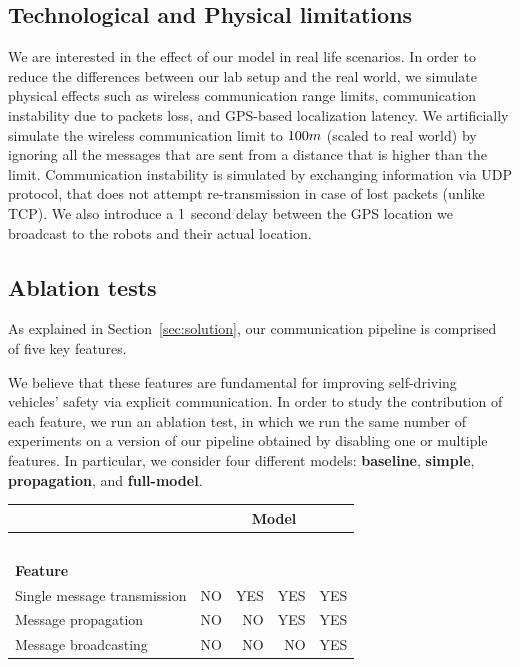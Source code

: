 \subsection{Technological and Physical limitations}
We are interested in the effect of our model in real life scenarios. In order to reduce the differences between 
our lab setup and the real world, we simulate physical effects such as wireless communication range limits, 
communication instability due to packets loss, and GPS-based localization latency.
We artificially simulate the wireless communication limit to $\wireless_limit_meter m$ (scaled to real world) by 
ignoring all the messages that are sent from a distance that is higher than the limit. Communication instability
is simulated by exchanging information via UDP protocol, that does not attempt re-transmission in case
of lost packets (unlike TCP). We also introduce a $\gps_delay_sec$ second delay between the GPS location 
we broadcast to the robots and their actual location.

\subsection{Ablation tests}
As explained in Section~\ref{sec:solution}, our communication pipeline is comprised of five key features.

We believe that these features are fundamental for improving self-driving vehicles' safety via explicit
communication. In order to study the contribution of each feature, we run an ablation test, in which we
run the same number of experiments on a version of our pipeline obtained by disabling one or multiple
features.
In particular, we consider four different models: \textbf{baseline}, \textbf{simple}, \textbf{propagation},
and \textbf{full-model}. 

\begin{table}[H]
\centering
\begin{tabular}{|l|r|r|r|r|}
\hline
& 
\multicolumn{4}{c|}{\textbf{Model}} \\
\hline
& 
	\parbox[t]{2mm}{} 
	& 
	\parbox[t]{2mm}{} 
	&
	\parbox[t]{2mm}{} 
	& 
	\parbox[t]{2mm}{} 
\\
& & & & \\
& & & & \\
& & & & \\
& & & & \\
\textbf{Feature} & & & & \\
\hline
Single message transmission & NO & YES & YES & YES \\
\hline
Message propagation & NO & NO & YES & YES \\
\hline
Message broadcasting & NO & NO & NO & YES \\
\hline
\end{tabular}
\end{table}
 

